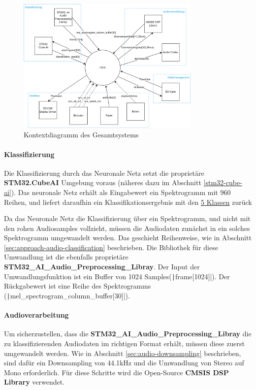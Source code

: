 \begin{figure}[H]
   	\centering
   	\includegraphics[width=0.8\textwidth]{images/04_spezifikation/kontextdiagramm_gesamt.drawio.png}
   	\caption{Kontextdiagramm des Gesamtsystems}
   	\label{fig:context_diagram_gesamt}
\end{figure}

\paragraph{Klassifizierung}

Die Klassifizierung durch das Neuronale Netz setzt die proprietäre \textbf{STM32.CubeAI} Umgebung voraus (näheres dazu im Abschnitt \ref{stm32-cube-ai}). Das neuronale Netz erhält als Eingabewert ein Spektrogramm mit 960 Reihen, und liefert daraufhin ein Klassifikationsergebnis mit den \hyperlink{nn-classes}{5 Klassen} zurück

Da das Neuronale Netz die Klassifizierung über ein Spektrogramm, und nicht mit den rohen Audiosamples vollzieht, müssen die Audiodaten zunächst in ein solches Spektrogramm umgewandelt werden. Das geschieht Reihenweise, wie in Abschnitt \ref{sec:approach-audio-classification} beschrieben. Die Bibliothek für diese Umwandlung ist die ebenfalls proprietäre \textbf{STM32\_AI\_Audio\_Preprocessing\_Libray}. Der Input der Umwandlungsfunktion ist ein Buffer von 1024 Samples(\texttt|frame[1024]|). Der Rückgabewert ist eine Reihe des Spektrogramms (\texttt|mel_spectrogram_column_buffer[30]|).

\paragraph{Audioverarbeitung}

Um sicherzustellen, dass die \textbf{STM32\_AI\_Audio\_Preprocessing\_Libray} die zu klassifizierenden Audiodaten im richtigen Format erhält, müssen diese zuerst umgewandelt werden. Wie in Abschnitt \ref{sec:audio-downsampling} beschrieben, sind dafür ein Downsampling von 44.1kHz und die Umwandlung von Stereo auf Mono erforderlich. Für diese Schritte wird die Open-Source \textbf{CMSIS DSP Library} verwendet.

